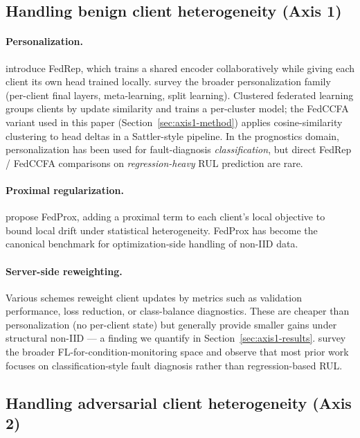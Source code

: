 \documentclass[preprint,12pt,authoryear]{elsarticle}
\begin{document}
\subsection{Handling benign client heterogeneity (Axis 1)}
\label{subsec:related-axis1}

\paragraph{Personalization.}
\citet{Collins2021FedRep} introduce FedRep, which trains a shared
encoder collaboratively while giving each client its own head
trained locally. \citet{Kairouz2021Advances} survey the broader
personalization family (per-client final layers, meta-learning,
split learning). Clustered federated learning
\citep{Sattler2020CFL} groups clients by update similarity and
trains a per-cluster model; the FedCCFA variant used in this
paper (Section~\ref{sec:axis1-method}) applies cosine-similarity
clustering to head deltas in a Sattler-style pipeline. In the
prognostics domain, personalization has been used for
fault-diagnosis \emph{classification}, but direct FedRep /
FedCCFA comparisons on \emph{regression-heavy} RUL prediction
are rare.

\paragraph{Proximal regularization.}
\citet{Li2020FedProx} propose FedProx, adding a proximal term to
each client's local objective to bound local drift under
statistical heterogeneity. FedProx has become the canonical
benchmark for optimization-side handling of non-IID data.

\paragraph{Server-side reweighting.}
Various schemes reweight client updates by metrics such as
validation performance, loss reduction, or class-balance
diagnostics. These are cheaper than personalization (no
per-client state) but generally provide smaller gains under
structural non-IID --- a finding we quantify in
Section~\ref{sec:axis1-results}. \citet{Berghout2022FLCondMon}
survey the broader FL-for-condition-monitoring space and observe
that most prior work focuses on classification-style fault
diagnosis rather than regression-based RUL.

\subsection{Handling adversarial client heterogeneity (Axis 2)}
\label{subsec:related-axis2}
\end{document}
